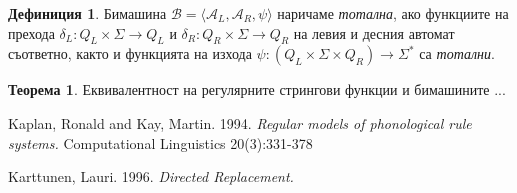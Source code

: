 \documentclass[12pt, oneside]{article}
\theoremstyle{definition}
\newtheorem{definition}{Дефиниция}[section]
\newtheorem{theorem}{Теорема}[section]
\begin{document}
\begin{definition}
	Бимашина \( \mathcal{B} = \langle \mathcal{A}_L, \mathcal{A}_R, \psi \rangle \) наричаме \emph{тотална}, ако функциите на прехода \( \delta_L: Q_L \times \Sigma \to Q_L \) и \( \delta_R: Q_R \times \Sigma \to Q_R \) на левия и десния автомат съответно, както и функцията на изхода \( \psi: (Q_L \times \Sigma \times Q_R) \to \Sigma^* \) са \emph{тотални}.
\end{definition}

\begin{theorem}
	Еквивалентност на регулярните стрингови функции и бимашините ...
\end{theorem}

\pagebreak

\begin{thebibliography}{9}
	Kaplan, Ronald and Kay, Martin. 1994.
	\textit{Regular models of phonological rule systems.}
	Computational Linguistics 20(3):331-378

	Karttunen, Lauri. 1996.
	\textit{Directed Replacement.}
	
\end{thebibliography}
	
\end{document}

